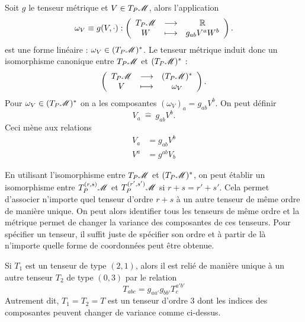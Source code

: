 \documentclass[a4paper,11pt]{report}
\begin{document}
                Soit $g$ le tenseur métrique et $V\in T_P\mathscr{M}$, alors l'application
                \begin{equation}
                    \omega_V\equiv g(V,\cdot):\left(
                \begin{array}{ccc}
                    T_P\mathscr{M} & \longrightarrow & \mathbb{R} \\
                    W & \longmapsto & g_{ab}V^a W^b
                \end{array}
                \right).
                \end{equation}
                est une forme linéaire : $\omega_V\in(T_P\mathscr{M})^*$. Le tenseur métrique induit donc un isomorphisme canonique entre $T_P\mathscr{M}$ et $(T_P\mathscr{M})^*$ :
                \begin{equation}
                    \left(
                \begin{array}{ccc}
                    T_P\mathscr{M} & \longrightarrow & (T_P\mathscr{M})^* \\
                    V & \longmapsto & \omega_V
                \end{array}
                \right).
                \end{equation}
                Pour $\omega_V\in(T_P\mathscr{M})^*$ on a les composantes $(\omega_V)_a = g_{ab}V^b$. On peut définir 
                \begin{equation}
                    V_a ~\hat{=}~ g_{ab}V^b.
                \end{equation}
                Ceci mène aux relations 
                \begin{align}
                    V_a &= g_{ab}V^b \\
                    V^a &= g^{ab}V_b
                \end{align}
                
                En utilisant l'isomorphisme entre $T_P\mathscr{M}$ et $(T_P\mathscr{M})^*$, on peut établir un isomorphisme entre $T_P^{(r,s)}\mathscr{M}$ et $T_P^{(r',s')}\mathscr{M}$ si $r+s=r'+s'$. Cela permet d'associer n'importe quel tenseur d'ordre $r+s$ à un autre tenseur de même ordre de manière unique. On peut alors identifier tous les tenseurs de même ordre et la métrique permet de changer la variance des composantes de ces tenseurs. Pour spécifier un tenseur, il suffit juste de spécifier son ordre et à partir de là n'importe quelle forme de coordonnées peut être obtenue.
                
                \begin{exmp}
                    Si $T_1$ est un tenseur de type $(2,1)$, alors il est relié de manière unique à un autre tenseur $T_2$ de type $(0,3)$ par le relation
                    \begin{equation}
                        T_{abc} = g_{aa'}g_{bb'}T^{a'b'}_c
                    \end{equation}
                    Autrement dit, $T_1 = T_2 = T$ est un tenseur d'ordre $3$ dont les indices des composantes peuvent changer de variance comme ci-dessus.
                \end{exmp}
                
\end{document}
